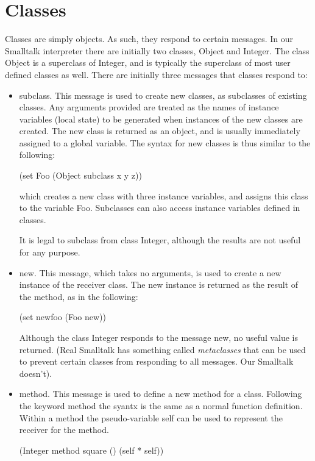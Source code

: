 \section{Classes}

Classes are simply objects.  As such, they respond to certain messages.
In our Smalltalk interpreter there are initially two classes, {\sf Object}
and {\sf Integer}.  
The class {\sf Object} is a superclass of {\sf Integer}, and is typically
the superclass of most user defined classes as well.
There are initially three messages that classes respond to:

\begin{itemize}
\item
{\sf subclass}.  This message is used to create new classes, as subclasses
of existing classes.  Any arguments provided are treated as the names of
instance variables (local state) to be generated when instances of the new
classes are created.  The new class is returned as an object, and is
usually immediately assigned to a global variable.
The syntax for new classes is thus similar to the following:
\begin{center}
{\sf (set Foo (Object subclass x y z))}
\end{center}
which creates a new class with three instance variables, and assigns this
class to the variable {\sf Foo}.  Subclasses can also access instance
variables defined in classes.

It is legal to subclass from class {\sf Integer}, although the results are not
useful for any purpose.

\item
{\sf new}.  This message, which takes no arguments, is used to create a new
instance of the receiver class.  The new instance is returned as the result
of the method, as in the following:
\begin{center}
{\sf (set newfoo (Foo new))}
\end{center}
Although the class {\sf Integer} responds to the message {\sf new}, no
useful value is returned.  (Real Smalltalk has something called 
{\em metaclasses} that can be used to prevent certain classes from
responding to all messages.  Our Smalltalk doesn't).
\item
{\sf method}.  This message is used to define a new method for a class.
Following the keyword {\sf method} the syantx is the same as a normal
function definition.  Within a method the pseudo-variable {\sf self} can be
used to represent the receiver for the method.
\begin{center}
{\sf (Integer method square () (self * self))}
\end{center}
\end{itemize}

